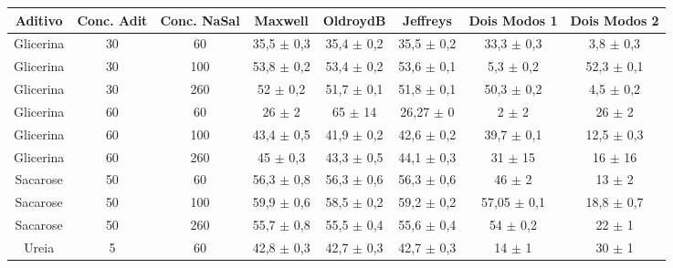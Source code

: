 	\begin{table}[h]
	{%
		\begin{tabular}{c c c | c c c c c}
			\toprule
			 Aditivo  & Conc. Adit & Conc. NaSal & Maxwell             & OldroydB             & Jeffreys             & Dois Modos 1            & Dois Modos 2            \\ \midrule
			Glicerina & 30         & 60         & 35,5    \(\pm\) 0,3 & 35,4     \(\pm\) 0,2 & 35,5     \(\pm\) 0,2 & 33,3        \(\pm\) 0,3 & 3,8         \(\pm\) 0,3 \\
			Glicerina & 30         & 100        & 53,8    \(\pm\) 0,2 & 53,4     \(\pm\) 0,2 & 53,6     \(\pm\) 0,1 & 5,3         \(\pm\) 0,2 & 52,3        \(\pm\) 0,1 \\
			Glicerina & 30         & 260        & 52      \(\pm\) 0,2 & 51,7     \(\pm\) 0,1 & 51,8     \(\pm\) 0,1 & 50,3        \(\pm\) 0,2 & 4,5         \(\pm\) 0,2 \\ 
			Glicerina & 60         & 60         & 26      \(\pm\) 2   & 65       \(\pm\) 14  & 26,27    \(\pm\) 0   & 2           \(\pm\) 2   & 26          \(\pm\) 2   \\
			Glicerina & 60         & 100        & 43,4    \(\pm\) 0,5 & 41,9     \(\pm\) 0,2 & 42,6     \(\pm\) 0,2 & 39,7        \(\pm\) 0,1 & 12,5        \(\pm\) 0,3 \\
			Glicerina & 60         & 260        & 45      \(\pm\) 0,3 & 43,3     \(\pm\) 0,5 & 44,1     \(\pm\) 0,3 & 31          \(\pm\) 15  & 16          \(\pm\) 16  \\ 
			Sacarose  & 50         & 60         & 56,3    \(\pm\) 0,8 & 56,3     \(\pm\) 0,6 & 56,3     \(\pm\) 0,6 & 46          \(\pm\) 2   & 13          \(\pm\) 2   \\
			Sacarose  & 50         & 100        & 59,9    \(\pm\) 0,6 & 58,5     \(\pm\) 0,2 & 59,2     \(\pm\) 0,2 & 57,05       \(\pm\) 0,1 & 18,8        \(\pm\) 0,7 \\
			Sacarose  & 50         & 260        & 55,7    \(\pm\) 0,8 & 55,5     \(\pm\) 0,4 & 55,6     \(\pm\) 0,4 & 54          \(\pm\) 0,2 & 22          \(\pm\) 1   \\  \midrule
			  Ureia   & 5          & 60         & 42,8    \(\pm\) 0,3 & 42,7     \(\pm\) 0,3 & 42,7     \(\pm\) 0,3 & 14          \(\pm\) 1   & 30          \(\pm\) 1   \\

\end{tabular}}
\end{table}

